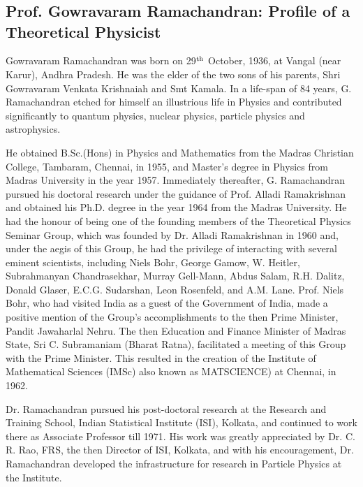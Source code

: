 
\chapter*{}%

\section*{Prof. Gowravaram Ramachandran: Profile of a Theoretical Physicist}
 
 Gowravaram Ramachandran was born on 29$^{\rm th}$ October, 1936, at Vangal (near Karur), Andhra Pradesh. He was the elder of the two sons of his parents, Shri Gowravaram Venkata Krishnaiah and Smt Kamala. In a life-span of 84 years, G. Ramachandran etched for himself an illustrious life in Physics and contributed significantly to quantum physics, nuclear physics, particle physics and astrophysics.
 
He obtained B.Sc.(Hons) in Physics and Mathematics from the Madras Christian College, Tambaram, Chennai, in 1955, and Master's degree in Physics from Madras University in the year 1957. Immediately thereafter, G. Ramachandran pursued his doctoral research under the guidance of Prof. Alladi Ramakrishnan and obtained his Ph.D. degree in the year 1964 from the Madras University. He had the honour of being one of the founding members of the Theoretical Physics Seminar Group, which was founded by Dr. Alladi Ramakrishnan in 1960 and, under the aegis of this Group, he had the privilege of interacting with several eminent scientists, including Niels Bohr, George Gamow, W. Heitler,  Subrahmanyan Chandrasekhar, Murray Gell-Mann, Abdus Salam, R.H. Dalitz, Donald Glaser, E.C.G. Sudarshan, Leon Rosenfeld, and A.M. Lane. Prof. Niels Bohr, who had visited India as a guest of the Government of India, made a positive mention of the Group's accomplishments to the then Prime Minister, Pandit Jawaharlal Nehru. The then Education and Finance Minister of Madras State, Sri C. Subramaniam (Bharat Ratna), facilitated a meeting of this Group with the Prime Minister. This resulted in the creation of the Institute of Mathematical Sciences (IMSc) also known as MATSCIENCE) at Chennai, in 1962.
 
 \eject
 
 Dr. Ramachandran pursued his post-doctoral research at the Research and Training School, Indian Statistical Institute (ISI), Kolkata, and continued to work there as Associate Professor till 1971. His work was greatly appreciated by Dr. C. R. Rao, FRS, the then Director of ISI, Kolkata, and with his encouragement, Dr. Ramachandran developed the infrastructure for research in Particle Physics at the Institute.
 
